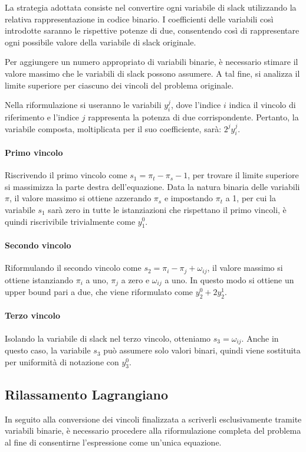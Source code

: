 \documentclass{article}
\begin{document}
La strategia adottata consiste nel convertire ogni variabile di slack utilizzando la relativa rappresentazione in codice binario. I coefficienti delle variabili così introdotte saranno le rispettive potenze di due, consentendo così di rappresentare ogni possibile valore della variabile di slack originale.

Per aggiungere un numero appropriato di variabili binarie, è necessario stimare il valore massimo che le variabili di slack possono assumere. A tal fine, si analizza il limite superiore per ciascuno dei vincoli del problema originale.

Nella riformulazione si useranno le variabili $y_i^j$, dove l'indice $i$ indica il vincolo di riferimento e l'indice $j$ rappresenta la potenza di due corrispondente. Pertanto, la variabile composta, moltiplicata per il suo coefficiente, sarà: $2^jy_i^j$.

\paragraph{Primo vincolo} Riscrivendo il primo vincolo come $s_1 = \pi_t - \pi_s - 1$, per trovare il limite superiore si massimizza la parte destra dell'equazione. Data la natura binaria delle variabili $\pi$, il valore massimo si ottiene azzerando $\pi_s$ e impostando $\pi_t$ a 1, per cui la variabile $s_1$ sarà zero in tutte le istanziazioni che rispettano il primo vincoli, è quindi riscrivibile trivialmente come $y_1^0$. 

\paragraph{Secondo vincolo} Riformulando il secondo vincolo come $s_2 = \pi_i - \pi_j + \omega_{ij}$, il valore massimo si ottiene istanziando $\pi_i$ a uno, $\pi_j$ a zero e $\omega_{ij}$ a uno. In questo modo si ottiene un upper bound pari a due, che viene riformulato come $y_2^0 + 2y_2^1$.

\paragraph{Terzo vincolo} Isolando la variabile di slack nel terzo vincolo, otteniamo $s_3 = \omega_{ij}$. Anche in questo caso, la variabile $s_3$ può assumere solo valori binari, quindi viene sostituita per uniformità di notazione con $y_3^0$.

\subsection{Rilassamento Lagrangiano}
In seguito alla conversione dei vincoli finalizzata a scriverli esclusivamente tramite variabili binarie, è necessario procedere alla riformulazione completa del problema al fine di consentirne l'espressione come un'unica equazione.
\end{document}
